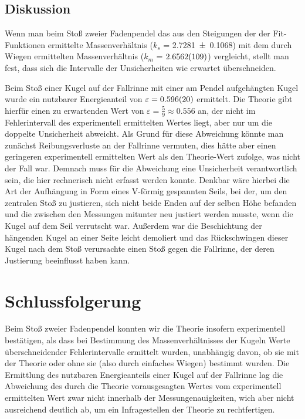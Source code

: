 \documentclass[
	a4paper,
	12pt,
	pagesize,
	ngerman
]{scrartcl}
\begin{document}
	\subsection{Diskussion}
	Wenn man beim Stoß zweier Fadenpendel das aus den Steigungen der der Fit-Funktionen ermittelte Massenverhältnis ($k_s$ =  \SI{2,7281 \pm 0,1068}{}) mit dem durch Wiegen ermittelten Massenverhältnis ($k_m$ = $\SI{2,6562 \pm 0,0109}{}$) vergleicht, stellt man fest, dass sich die Intervalle der Unsicherheiten wie erwartet überschneiden.
	\par
	Beim Stoß einer Kugel auf der Fallrinne mit einer am Pendel aufgehängten Kugel wurde ein nutzbarer Energieanteil von $\varepsilon = \SI{0,596 \pm 0,02}{} $ ermittelt.
	Die Theorie gibt hierfür einen zu erwartenden Wert von $\varepsilon = \frac{\num{5}}{\num{9}} \approx \num{0,556}$ an, der nicht im Fehlerintervall des experimentell ermittelten Wertes liegt, aber nur um die doppelte Unsicherheit abweicht.
	Als Grund für diese Abweichung könnte man zunächst Reibungsverluste an der Fallrinne vermuten, dies hätte aber einen geringeren experimentell ermittelten Wert als den Theorie-Wert zufolge, was nicht der Fall war.
	Demnach muss für die Abweichung eine Unsicherheit verantwortlich sein, die hier rechnerisch nicht erfasst werden konnte.
	Denkbar wäre hierbei die Art der Aufhängung in Form eines V-förmig gespannten Seils, bei der, um den zentralen Stoß zu justieren, sich nicht beide Enden auf der selben Höhe befanden und die zwischen den Messungen mitunter neu justiert werden musste, wenn die Kugel auf dem Seil verrutscht war.
	Außerdem war die Beschichtung der hängenden Kugel an einer Seite leicht demoliert und das Rückschwingen dieser Kugel nach dem Stoß verursachte einen Stoß gegen die Fallrinne, der deren Justierung beeinflusst haben kann.
	
	\section{Schlussfolgerung}
	Beim Stoß zweier Fadenpendel konnten wir die Theorie insofern experimentell bestätigen, als dass bei Bestimmung des Massenverhältnisses der Kugeln Werte überschneidender Fehlerintervalle ermittelt wurden, unabhängig davon, ob sie mit der Theorie oder ohne sie (also durch einfaches Wiegen) bestimmt wurden.
	Die Ermittlung des nutzbaren Energieanteils einer Kugel auf der Fallrinne lag die Abweichung des durch die Theorie vorausgesagten Wertes vom experimentell ermittelten Wert zwar nicht innerhalb der Messungenauigkeiten, wich aber nicht ausreichend deutlich ab, um ein Infragestellen der Theorie zu rechtfertigen.
	
\end{document}
